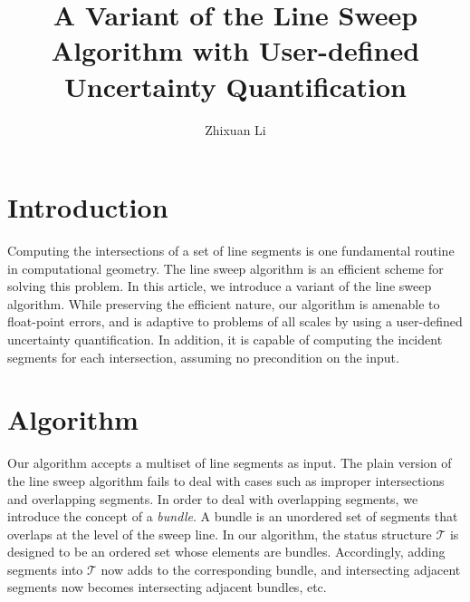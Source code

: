 \documentclass[a4paper]{article}
\title{A Variant of the Line Sweep Algorithm with User-defined Uncertainty Quantification}
\author{Zhixuan Li}
\begin{document}
\maketitle

\section{Introduction}
Computing the intersections of a set of line segments
is one fundamental routine in computational geometry.
The line sweep algorithm \cite{CG} is an efficient scheme
for solving this problem.
In this article, we introduce a variant of the line sweep algorithm.
While preserving the efficient nature,
our algorithm is amenable to float-point errors, 
and is adaptive to problems of all scales by
using a user-defined uncertainty quantification.
In addition, it is capable of computing the incident segments
for each intersection, assuming no precondition on the input.

\section{Algorithm}
Our algorithm accepts a multiset of line segments as input.
The plain version of the line sweep algorithm fails to
deal with cases such as improper intersections and overlapping segments. 
In order to deal with overlapping segments,
we introduce the concept of a \emph{bundle}.
A bundle is an unordered set of segments
that overlaps at the level of the sweep line.
In our algorithm, the status structure $\mathcal{T}$ is designed to be
an ordered set whose elements are bundles.
Accordingly, 
adding segments into $\mathcal{T}$ now
adds to the corresponding bundle,
and intersecting adjacent segments now becomes
intersecting adjacent bundles, etc.


\newcommand{\Lhat}{\hat{L}}
\newcommand{\Uhat}{\hat{U}}
\newcommand{\Chat}{\hat{C}}
\end{document}
